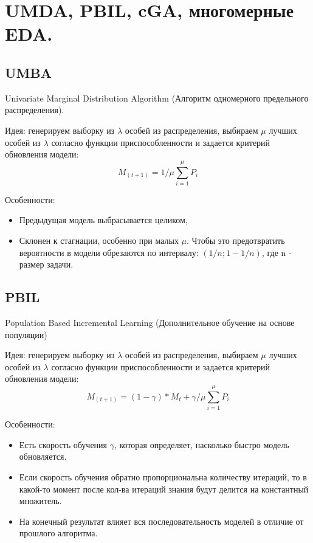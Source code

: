 \section{UMDA, PBIL, cGA, многомерные EDA.}

\subsection*{UMBA}

Univariate Marginal Distribution Algorithm (Алгоритм одномерного предельного распределения).

Идея: генерируем выборку из $\lambda$ особей из распределения, выбираем $\mu$ лучших особей из $\lambda$ согласно функции приспособленности и задается критерий обновления модели: $$M_{(t+1)} =  1/\mu \sum_{i=1}^{\mu} P_i $$

Особенности: 

\begin{itemize}
      \item Предыдущая модель выбрасывается целиком, 
      \item Склонен к стагнации, особенно при малых $\mu$. Чтобы это предотвратить вероятности в модели обрезаются по интервалу: $(1/n; 1-1/n)$, где  n -  размер задачи.
   \end{itemize}

\subsection*{PBIL}
Population Based Incremental Learning (Дополнительное обучение на основе популяции)

Идея: генерируем выборку из $\lambda$ особей из распределения, выбираем $\mu$ лучших особей из $\lambda$ согласно функции приспособленности и задается критерий обновления модели: $$M_{(t+1)} =  (1 - \gamma)*M_t +\gamma/\mu\sum_{i=1}^{\mu} P_i $$

Особенности:
\begin{itemize}
      \item Есть скорость обучения $\gamma$, которая определяет, насколько быстро модель обновляется.
      \item Если скорость обучения обратно пропорциональна количеству итераций, то в какой-то момент после кол-ва итераций знания будут делится на константный множитель.
      \item На конечный результат влияет вся последовательность моделей в отличие от прошлого алгоритма.
   \end{itemize}



